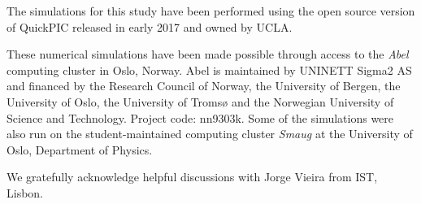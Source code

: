 \documentclass[aps,prstab,reprint,amsmath,amssymb,groupedaddress]{revtex4-1}
\begin{document}
The simulations for this study have been performed using the open source version of QuickPIC released in early 2017
and owned by UCLA.

These numerical simulations have been made possible through access to the \emph{Abel} computing cluster in Oslo, Norway.
Abel is maintained by UNINETT Sigma2 AS and financed by the Research Council of Norway, the University of Bergen, the
University of Oslo, the University of Troms{\o} and the Norwegian University of Science and Technology. Project code:
nn9303k. Some of the simulations were also run on the student-maintained computing cluster \emph{Smaug} at the
University of Oslo, Department of Physics.

We gratefully acknowledge helpful discussions with Jorge Vieira from IST, Lisbon.
\vfill


\end{document}
